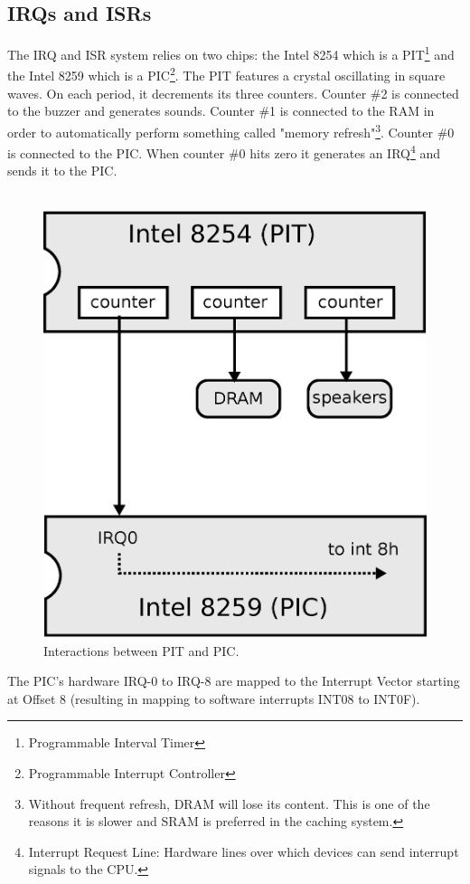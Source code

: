 \documentclass[book.tex]{subfiles}
\begin{document}
\subsection{IRQs and ISRs}
The IRQ and ISR system relies on two chips: the Intel 8254 which is a PIT\footnote{Programmable Interval Timer} and the Intel 8259 which is a PIC\footnote{Programmable Interrupt Controller}. The PIT features a crystal oscillating in square waves. On each period, it decrements its three counters. Counter \#2 is connected to the buzzer and generates sounds. Counter \#1 is connected to the RAM in order to automatically perform something called "memory refresh"\footnote{Without frequent refresh, DRAM will lose its content. This is one of the reasons it is slower and SRAM is preferred in the caching system.}. Counter \#0 is connected to the PIC. 
When counter \#0 hits zero it generates an IRQ\footnote{Interrupt Request Line: Hardware lines over which devices can send interrupt signals to the CPU.} and sends it to the PIC.\\

\
\par
\begin{figure}[H]
  \centering
  \includegraphics[width=.65\textwidth]{imgs/drawings/heatbeats.eps}
  \caption{Interactions between PIT and PIC.}
\end{figure}
\par

The PIC's hardware IRQ-0 to IRQ-8 are mapped to the Interrupt Vector starting at Offset 8 (resulting in mapping to software interrupts INT08 to INT0F). \pagebreak
\end{document}
